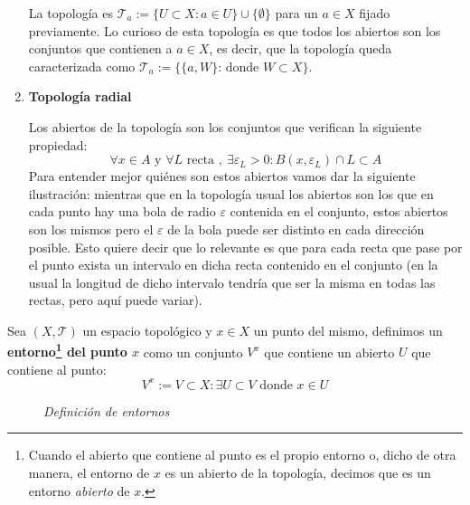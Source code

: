 \begin{ej}
\begin{enumerate}
    La topología es $\mathcal{T}_a := \{U \subset X: a \in U\} \cup \{\emptyset\}$ para un $a\in X$ fijado previamente. Lo curioso de esta topología es que todos los abiertos son los conjuntos que contienen a $a\in X$, es decir, que la topología queda caracterizada como $\mathcal{T}_a := \{\{a, W\} \text{: donde }W\subset X\}$.
    
    \item \textbf{Topología radial}
    
    Los abiertos de la topología son los conjuntos que verifican la siguiente propiedad:
    \[
		\forall x \in A \mbox{ y }\forall L \mbox{ recta }, \ \exists \varepsilon_L > 0: B(x, \varepsilon_L) \cap L \subset A    
    \]
    Para entender mejor quiénes son estos abiertos vamos dar la siguiente ilustración: mientras que en la topología usual los abiertos son los que en cada punto hay una bola de radio $\varepsilon$ contenida en el conjunto, estos abiertos son los mismos pero el $\varepsilon$ de la bola puede ser distinto en cada dirección posible. Esto quiere decir que lo relevante es que para cada recta que pase por el punto exista un intervalo en dicha recta contenido en el conjunto (en la usual la longitud de dicho intervalo tendría que ser la misma en todas las rectas, pero aquí puede variar).
\end{enumerate}
\end{ej}

\begin{defi}[Entorno]
Sea $(X, \mathcal{T})$ un espacio topológico y $x\in X$ un punto del mismo, definimos un \textbf{entorno\footnote{Cuando el abierto que contiene al punto es el propio entorno o, dicho de otra manera, el entorno de $x$ es un abierto de la topología, decimos que es un entorno \textit{abierto} de $x$.} del punto $x$} como un conjunto $V^x$ que contiene un abierto $U$ que contiene al punto:
\[
V^x := V\subset X : \exists U \subset V \text{ donde }x\in U
\]
\end{defi}

\begin{figure}[H]
    \centering
    \caption{\textit{Definición de entornos}}
    \label{fig:definición-entornos}
\end{figure}

